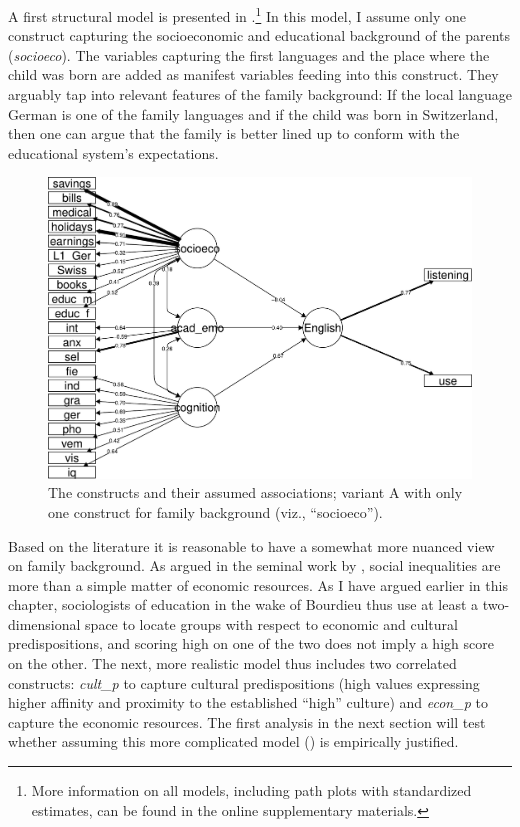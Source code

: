 \documentclass[output=paper]{langsci/langscibook}
\begin{document}
A first structural model is presented in .\footnote{More information on all models, including path plots with standardized estimates, can be found in the online supplementary materials.} In this model, I assume only one construct capturing the socioeconomic and educational background of the parents (\textit{socioeco}). The variables capturing the first languages and the place where the child was born are added as manifest variables feeding into this construct. They arguably tap into relevant features of the family background: If the local language German is one of the family languages and if the child was born in Switzerland, then one can argue that the family is better lined up to conform with the educational system’s expectations.


\begin{figure}
\includegraphics[width=\textwidth]{figures/Figure5.3.pdf}
\caption{The constructs and their assumed associations; variant A with only one construct for family background (viz., ``socioeco'').\label{fig:05:3}}
\end{figure}

Based on the literature it is reasonable to have a somewhat more nuanced view on family background. As argued in the seminal work by \citet{Bourdieu1979}, social inequalities are more than a simple matter of economic resources. As I have argued earlier in this chapter, sociologists of education in the wake of Bourdieu thus use at least a two-dimensional space to locate groups with respect to economic and cultural predispositions, and scoring high on one of the two does not imply a high score on the other. The next, more realistic model thus includes two correlated constructs: \textit{cult\_p} to capture cultural predispositions (high values expressing higher affinity and proximity to the established ``high'' culture) and \textit{econ\_p} to capture the economic resources. The first analysis in the next section will test whether assuming this more complicated model () is empirically justified.
\end{document}
